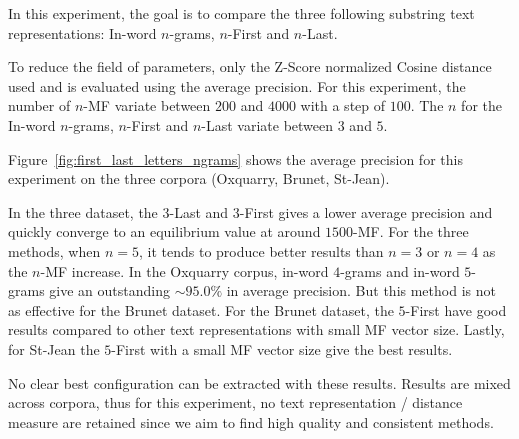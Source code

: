 In this experiment, the goal is to compare the three following substring text representations: In-word $n$-grams, $n$-First and $n$-Last.

To reduce the field of parameters, only the Z-Score normalized Cosine distance used and is evaluated using the average precision.
For this experiment, the number of $n$-MF variate between $200$ and $4000$ with a step of $100$.
The $n$ for the In-word $n$-grams, $n$-First and $n$-Last variate between $3$ and $5$.

Figure~\ref{fig:first_last_letters_ngrams} shows the average precision for this experiment on the three corpora (Oxquarry, Brunet, St-Jean).

In the three dataset, the $3$-Last and $3$-First gives a lower average precision and quickly converge to an equilibrium value at around $1500$-MF.
For the three methods, when $n = 5$, it tends to produce better results than $n = 3$ or $n = 4$ as the $n$-MF increase.
In the Oxquarry corpus, in-word $4$-grams and in-word $5$-grams give an outstanding $\sim 95.0\%$ in average precision.
But this method is not as effective for the Brunet dataset.
For the Brunet dataset, the $5$-First have good results compared to other text representations with small MF vector size.
Lastly, for St-Jean the $5$-First with a small MF vector size give the best results.

No clear best configuration can be extracted with these results.
Results are mixed across corpora, thus for this experiment, no text representation / distance measure are retained since we aim to find high quality and consistent methods.


